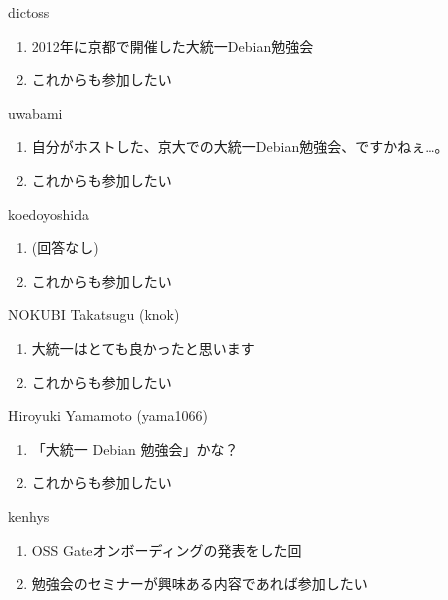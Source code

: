 \begin{prework}{ dictoss }
  \begin{enumerate}
  \item 2012年に京都で開催した大統一Debian勉強会
  \item これからも参加したい
  \end{enumerate}
\end{prework}

\begin{prework}{ uwabami }
  \begin{enumerate}
  \item 自分がホストした、京大での大統一Debian勉強会、ですかねぇ…。
  \item これからも参加したい
  \end{enumerate}
\end{prework}

\begin{prework}{ koedoyoshida }
  \begin{enumerate}
  \item (回答なし)
  \item これからも参加したい
  \end{enumerate}
\end{prework}

\begin{prework}{ NOKUBI Takatsugu (knok) }
  \begin{enumerate}
  \item 大統一はとても良かったと思います
  \item これからも参加したい
  \end{enumerate}
\end{prework}

\begin{prework}{ Hiroyuki Yamamoto (yama1066) }
  \begin{enumerate}
  \item 「大統一 Debian 勉強会」かな？
  \item これからも参加したい
  \end{enumerate}
\end{prework}

\begin{prework}{ kenhys }
  \begin{enumerate}
  \item OSS Gateオンボーディングの発表をした回
  \item 勉強会のセミナーが興味ある内容であれば参加したい
  \end{enumerate}
\end{prework}

